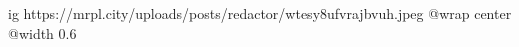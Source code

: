  
 
 
 
 

\ifcmt
  ig https://mrpl.city/uploads/posts/redactor/wtesy8ufvrajbvuh.jpeg
  @wrap center
  @width 0.6
\fi
